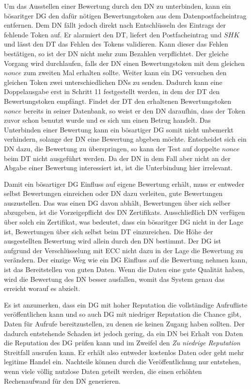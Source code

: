 \documentclass[
	fontsize=11pt,
	headings=small,
	parskip=half,           %
	bibliography=totoc,
	numbers=noenddot,       %
	open=any,               %
]{scrreprt}
\begin{document}
Um das Ausstellen einer Bewertung durch den DN zu unterbinden, kann ein bösaritger DG den dafür nötigen Bewertungstoken aus dem Datenpostfacheintrag entfernen. Dem DN fällt jedoch direkt nach Entschlüsseln des Eintrags der fehlende Token auf. Er alarmiert den DT, liefert den Postfacheintrag und $SHK$ und lässt den DT das Fehlen des Tokens validieren. Kann dieser das Fehlen bestätigen, so ist der DN nicht mehr zum Bezahlen verpflichtet. Der gleiche Vorgang wird durchlaufen, falls der DN einen Bewertungstoken mit dem gleichen $nonce$ zum zweiten Mal erhalten sollte. Weiter kann ein DG versuchen den gleichen Token zwei unterschiedlichen DNs zu senden. Dadurch kann eine Doppelausgabe erst in Schritt 11 festgestellt werden, in dem der DT den Bewertungstoken empfängt. Findet der DT den erhaltenen Bewertungstoken $nonce$ bereits in seiner Datenbank, so weist er den DN daraufhin, dass der Token zuvor schon benutzt wurde und es sich um einen Betrug handelt. Das Unterbinden einer Bewertung kann ein bösartiger DG somit nicht unbemerkt verhindern, solange der DN eine Bewertung abgeben möchte. Entscheidet sich ein DN dazu, die Bewertung zu überspringen, so kann der Test auf doppelte $nonce$ beim DT nicht ausgeführt werden. Da der DN in dem Fall aber nicht an der Abgabe einer Bewertung interessiert ist, ist die Unterbindung hier irrelevant.

Damit ein bösartiger DG Einfluss auf eigene Bewertung erhält, muss er entweder selbst Bewertungen einreichen oder DN dazu verleiten, gute Bewertungen auszustellen. Das was einen DG davon abhält, Bewertungen über sich selber abzugeben, ist die Vorzeigepflicht des DN Zertifikats. Ausschließlich DN verfügen über solch ein Zertifikat, was bedeutet, dass ein bösaritger DG nicht in der Lage ist, Bewertungen über sich selbst beim DT einzureichen. Die Höhe der ausgestellten Bewertung wird allein durch den DN bestimmt. Der DG ist aufgrund der Verschlüsselung mit ECC nicht dazu in der Lage die Bewertung zu verändern. Der einzige Weg wie ein DG Einfluss auf die Bewertung nehmen kann, ist das Bereitstellen von guten Daten. Wenn die Daten eine gute Qualität haben, wird die Bewertung des DN besser ausfallen, womit das System genau das erreicht worauf es abzielt.

Es ist anzumerken, dass ein DG mit hoher Reputation die vollständige Aufrufliste veröffentlichen kann und so auch DG mit niedriger Reputation die Chance gibt, Daten für Aufrufe bereitzustellen, zu denen sie keinen Zugang haben sollten. Der dadurch entstehende Schaden ist jedoch gering, da ein DN bei Erhalt von Daten die Reputation des DG prüfen kann und im Zweifel den \textit{Zu niedrige Reputation} Streitfall ausrufen kann. Er erhält also entweder kostenlos Daten oder geht mehr legitime Handel ein. Nachteile können durch die Veröffentlichung nur entstehen, wenn viele völlig nutzlose Daten geteilt werden, die einen erhöhten Rechenaufwand für den DN generieren.
\end{document}
